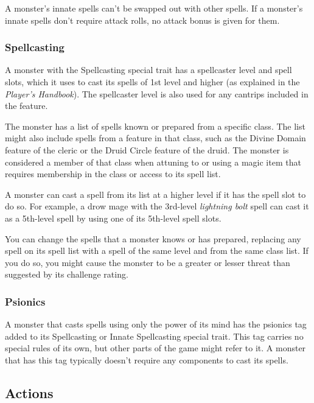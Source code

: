 \documentclass[
]{article}
\begin{document}
A monster's innate spells can't be swapped out with other spells. If a
monster's innate spells don't require attack rolls, no attack bonus is
given for them.

\hypertarget{spellcasting}{%
\subsubsection{Spellcasting}\label{spellcasting}}

A monster with the Spellcasting special trait has a spellcaster level
and spell slots, which it uses to cast its spells of 1st level and
higher (as explained in the \emph{Player's Handbook}). The spellcaster
level is also used for any cantrips included in the feature.

The monster has a list of spells known or prepared from a specific
class. The list might also include spells from a feature in that class,
such as the Divine Domain feature of the cleric or the Druid Circle
feature of the druid. The monster is considered a member of that class
when attuning to or using a magic item that requires membership in the
class or access to its spell list.

A monster can cast a spell from its list at a higher level if it has the
spell slot to do so. For example, a drow mage with the 3rd-level
\emph{lightning bolt} spell can cast it as a 5th-level spell by using
one of its 5th-level spell slots.

You can change the spells that a monster knows or has prepared,
replacing any spell on its spell list with a spell of the same level and
from the same class list. If you do so, you might cause the monster to
be a greater or lesser threat than suggested by its challenge rating.

\hypertarget{psionics}{%
\subsubsection{Psionics}\label{psionics}}

A monster that casts spells using only the power of its mind has the
psionics tag added to its Spellcasting or Innate Spellcasting special
trait. This tag carries no special rules of its own, but other parts of
the game might refer to it. A monster that has this tag typically
doesn't require any components to cast its spells.

\hypertarget{actions}{%
\subsection{Actions}\label{actions}}
\end{document}
